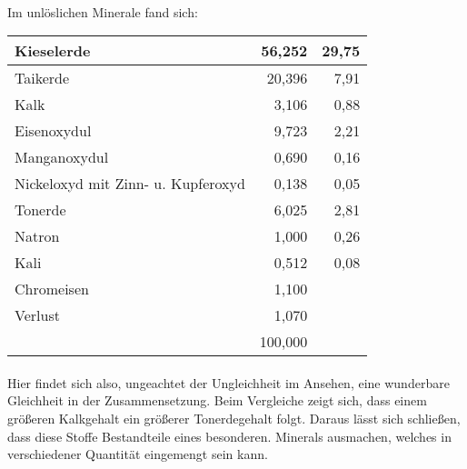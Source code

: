 \documentclass[a4paper, 11pt, oneside]{article}
\begin{document}
\paragraph{}
Im unlöslichen Minerale fand sich:
\begin{center}
\begin{tabular}{ |p{30mm}|r|r| }
    \hline
    Kieselerde & 56,252 & 29,75\\\hline
    Taikerde & 20,396 & 7,91\\\hline
    Kalk & 3,106 & 0,88\\\hline
    Eisenoxydul & 9,723 & 2,21\\\hline
    Manganoxydul & 0,690 & 0,16\\\hline
    Nickeloxyd mit Zinn- u. Kupferoxyd & 0,138 & 0,05\\\hline
    Tonerde & 6,025 & 2,81\\\hline
    Natron & 1,000 & 0,26\\\hline
    Kali & 0,512 & 0,08\\\hline
    Chromeisen & 1,100 & \\\hline
    Verlust & 1,070 & \\\hline
     & 100,000 & \\
    \hline
\end{tabular}
\end{center}
\paragraph{}
Hier findet sich also, ungeachtet der Ungleichheit im Ansehen, eine wunderbare Gleichheit in der Zusammensetzung. Beim Vergleiche zeigt sich, dass einem größeren Kalkgehalt ein größerer Tonerdegehalt folgt. Daraus lässt sich schließen, dass diese Stoffe Bestandteile eines besonderen. Minerals ausmachen, welches in verschiedener Quantität eingemengt sein kann.
\end{document}
